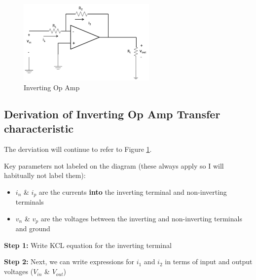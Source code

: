 \documentclass{handout}
\begin{document}
\begin{figure}
\centering
\includegraphics[width=0.6\textwidth]{InvertingOpAmp.jpg}
\caption{Inverting Op Amp}
\label{fig: InvertingOpAmp}
\end{figure}

\subsection{Derivation of Inverting Op Amp Transfer characteristic}
The derviation will continue to refer to Figure \ref{fig: InvertingOpAmp}.

Key parameters not labeled on the diagram (these always apply so I will habitually not label them):
\begin{itemize}
\item $i_n$ \& $i_p$ are the currents \textbf{into} the inverting terminal and non-inverting terminals
\item $v_n$ \& $v_p$ are the voltages between the inverting and non-inverting terminals and ground
\end{itemize}

\textbf{Step 1:}  Write KCL equation for the inverting terminal

\textbf{Step 2:} Next, we can write expressions for $i_1$ and $i_2$ in terms of input and output voltages ($V_{in}$ \& $V_{out}$)
\end{document}
